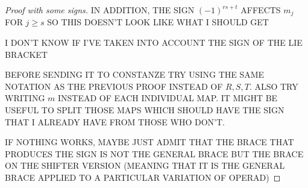 \documentclass[twoside]{article}
\begin{document}
\begin{proof}[Proof with some signs]
IN ADDITION, THE SIGN $(-1)^{rs+t}$ AFFECTS $m_j$ FOR $j\geq s$ SO THIS DOESN'T LOOK LIKE WHAT I SHOULD GET

I DON'T KNOW IF I'VE TAKEN INTO ACCOUNT THE SIGN OF THE LIE BRACKET

BEFORE SENDING IT TO CONSTANZE TRY USING THE SAME NOTATION AS THE PREVIOUS PROOF INSTEAD OF $R,S,T$. ALSO TRY WRITING $m$ INSTEAD OF EACH INDIVIDUAL MAP. IT MIGHT BE USEFUL TO SPLIT THOSE MAPS WHICH SHOULD HAVE THE SIGN THAT I ALREADY HAVE FROM THOSE WHO DON'T.

IF NOTHING WORKS, MAYBE JUST ADMIT THAT THE BRACE THAT PRODUCES THE SIGN IS NOT THE GENERAL BRACE BUT THE BRACE ON THE SHIFTER VERSION (MEANING THAT IT IS THE GENERAL BRACE APPLIED TO A PARTICULAR VARIATION OF OPERAD)
\end{proof}
%
%
%
%
%
%
%
\end{document}
